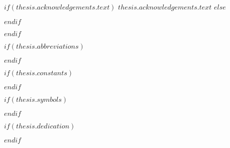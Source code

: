 \begin{acknowledgements}
\addchaptertocentry{\acknowledgementname} %
$if(thesis.acknowledgements.text)$
$thesis.acknowledgements.text$
$else$

$endif$
\end{acknowledgements}

$endif$


\begingroup
\hypersetup{linkcolor=$if(toclinkcolor)$$toclinkcolor$$else$black$endif$}

\tableofcontents %

\listoffigures %

\listoftables %

\endgroup


$if(thesis.abbreviations)$



$endif$

$if(thesis.constants)$



$endif$

$if(thesis.symbols)$



$endif$

$if(thesis.dedication)$

\dedicatory{} 

$endif$


\mainmatter %

\pagestyle{thesis} %
